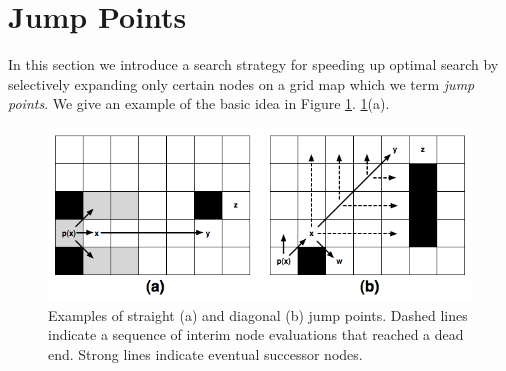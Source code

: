 \section{Jump Points}
In this section we introduce a search strategy for speeding up
optimal search by selectively expanding only certain nodes on a grid map
which we term \emph{jump points}.
We give an example of the basic idea in Figure \ref{fig:jumppoints}.
\ref{fig:jumppoints}(a).

\begin{figure}[tb]
       \begin{center}
		   \includegraphics[width=0.95\columnwidth, trim = 10mm 10mm 10mm 0mm]
			{diagrams/jumppoints.png}
       \end{center}
	\vspace{-3pt}
       \caption{Examples of straight (a) and diagonal (b) jump points.
Dashed lines indicate a sequence of interim node evaluations that reached
a dead end. Strong lines indicate eventual successor nodes.}
       \label{fig:jumppoints}
\end{figure}

